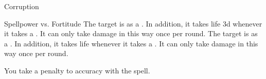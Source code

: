 \begin{spellsection}{Corruption}
\begin{spellheader}
\end{spellheader}
\begin{spellcontent}
\begin{spelltargetinginfo}
\end{spelltargetinginfo}
\begin{spelleffects}
\begin{spellattack}{Spellpower vs. Fortitude}
\spellsuccess
The target is  as a .
In addition, it takes life  \minus3d whenever it takes a .
It can only take damage in this way once per round.
\spellcritical
The target is  as a .
In addition, it takes life  whenever it takes a .
It can only take damage in this way once per round.
\end{spellattack}
\end{spelleffects}
\end{spellcontent}
\begin{spellfooter}
\end{spellfooter}
\begin{spellsubcontent}
\begin{spellcantrip}
You take a  penalty to accuracy with the spell.
\end{spellcantrip}
\end{spellsubcontent}
\end{spellsection}

